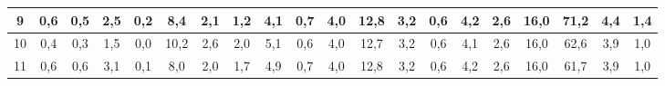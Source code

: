 \begin{sidewaystable}[]
\begin{tabular}{|c|c|c|c|c|c|c|c|c|c|c|c|c|c|c|c|c|c|c|c|}
    9  & 0,6                                             & 0,5                                             & 2,5                                             & 0,2                                             & 8,4                                              & 2,1                                              & 1,2                                              & 4,1                                              & 0,7                                              & 4,0                                              & 12,8                                             & 3,2                                              & 0,6                                              & 4,2                                              & 2,6                                              & 16,0                                             & 71,2                                             & 4,4                                              & 1,4                                              \\ \hline
    10 & 0,4                                             & 0,3                                             & 1,5                                             & 0,0                                             & 10,2                                             & 2,6                                              & 2,0                                              & 5,1                                              & 0,6                                              & 4,0                                              & 12,7                                             & 3,2                                              & 0,6                                              & 4,1                                              & 2,6                                              & 16,0                                             & 62,6                                             & 3,9                                              & 1,0                                              \\ \hline
    11 & 0,6                                             & 0,6                                             & 3,1                                             & 0,1                                             & 8,0                                              & 2,0                                              & 1,7                                              & 4,9                                              & 0,7                                              & 4,0                                              & 12,8                                             & 3,2                                              & 0,6                                              & 4,2                                              & 2,6                                              & 16,0                                             & 61,7                                             & 3,9                                              & 1,0                                              \\ \hline

\end{tabular}
\end{sidewaystable}
